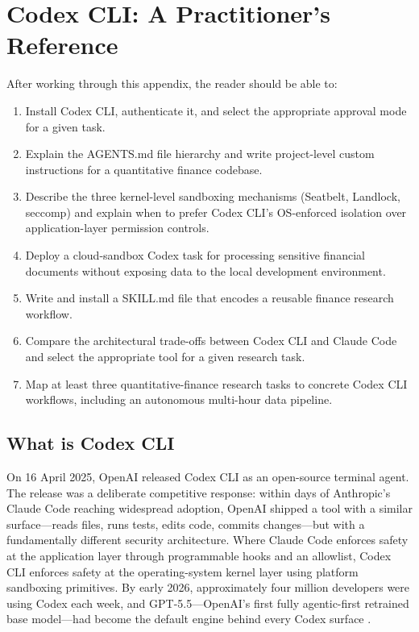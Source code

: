 \chapter{Codex CLI: A Practitioner's Reference}
\label{app:codex}

\begin{remark}
After working through this appendix, the reader should be able to:
\begin{enumerate}
  \item Install Codex CLI, authenticate it, and select the appropriate approval
        mode for a given task.
  \item Explain the AGENTS.md file hierarchy and write project-level custom
        instructions for a quantitative finance codebase.
  \item Describe the three kernel-level sandboxing mechanisms (Seatbelt,
        Landlock, seccomp) and explain when to prefer Codex CLI's OS-enforced
        isolation over application-layer permission controls.
  \item Deploy a cloud-sandbox Codex task for processing sensitive financial
        documents without exposing data to the local development environment.
  \item Write and install a SKILL.md file that encodes a reusable finance
        research workflow.
  \item Compare the architectural trade-offs between Codex CLI and Claude Code
        and select the appropriate tool for a given research task.
  \item Map at least three quantitative-finance research tasks to concrete
        Codex CLI workflows, including an autonomous multi-hour data pipeline.
\end{enumerate}
\end{remark}

\section{What is Codex CLI}
\label{app:codex:overview}

\begin{context}
On 16 April 2025, OpenAI released Codex CLI as an open-source terminal agent.
The release was a deliberate competitive response: within days of Anthropic's
Claude Code reaching widespread adoption, OpenAI shipped a tool with a similar
surface---reads files, runs tests, edits code, commits changes---but with a
fundamentally different security architecture.  Where Claude Code enforces
safety at the application layer through programmable hooks and an allowlist,
Codex CLI enforces safety at the operating-system kernel layer using platform
sandboxing primitives.  By early 2026, approximately four million developers
were using Codex each week, and GPT-5.5---OpenAI's first fully agentic-first
retrained base model---had become the default engine behind every Codex surface
\citep{openai2026gpt55}.
\end{context}

